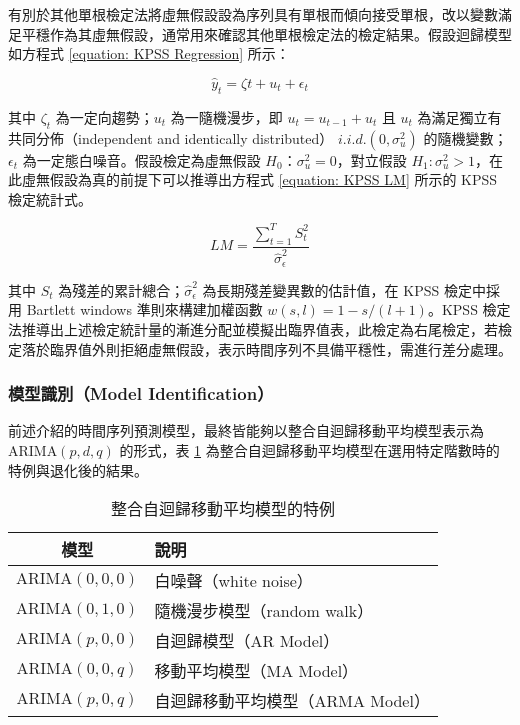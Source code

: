 有別於其他單根檢定法將虛無假設設為序列具有單根而傾向接受單根，改以變數滿足平穩作為其虛無假設，通常用來確認其他單根檢定法的檢定結果。假設迴歸模型如方程式 \eqref{equation: KPSS Regression} 所示：

\begin{equation}\label{equation: KPSS Regression}
  \hat{y}_{t} = \zeta t + u_{t}  + \epsilon_{t}
\end{equation}

其中 $\zeta_t$ 為一定向趨勢；$u_{t}$ 為一隨機漫步，即 $u_{t} = u_{t-1} + u_{t}$ 且 $u_t$ 為滿足獨立有共同分佈（independent and identically distributed） $i.i.d. (0, \sigma_{u}^{2})$ 的隨機變數；$\epsilon_{t}$ 為一定態白噪音。假設檢定為虛無假設 $H_0$：$\sigma_{u}^{2} = 0$，對立假設 $H_1: \sigma_{u}^{2} > 1$，在此虛無假設為真的前提下可以推導出方程式 \eqref{equation: KPSS LM} 所示的 KPSS 檢定統計式。

\begin{equation}\label{equation: KPSS LM}
  LM = \frac{\sum_{t = 1}^{T} S_{t}^{2}}{\hat{\sigma}_{\epsilon}^{2}}
\end{equation}

其中 $S_t$ 為殘差的累計總合；$\hat{\sigma}_{\epsilon}^{2}$ 為長期殘差變異數的估計值，在 KPSS 檢定中採用 Bartlett windows 準則來構建加權函數 $w(s, l) = 1 - s/(l + 1)$。KPSS 檢定法推導出上述檢定統計量的漸進分配並模擬出臨界值表，此檢定為右尾檢定，若檢定落於臨界值外則拒絕虛無假設，表示時間序列不具備平穩性，需進行差分處理。

\subsubsection{模型識別（Model Identification）}

前述介紹的時間序列預測模型，最終皆能夠以整合自迴歸移動平均模型表示為 $\text{ARIMA}(p, d, q)$ 的形式，表 \ref{table: Special Case of ARIMA(p, q, r)} 為整合自迴歸移動平均模型在選用特定階數時的特例與退化後的結果。

\begin{table}[htp]
  \centering
  \caption[整合自迴歸移動平均模型的特例]{整合自迴歸移動平均模型的特例}
  \begin{tabular*}{\textwidth}{cl}
    \toprule
    \textbf{模型}           & \textbf{說明}                     \\
    \midrule
    $\text{ARIMA}(0, 0, 0)$ & 白噪聲（white noise）             \\
    $\text{ARIMA}(0, 1, 0)$ & 隨機漫步模型（random walk）       \\
    $\text{ARIMA}(p, 0, 0)$ & 自迴歸模型（AR Model）            \\
    $\text{ARIMA}(0, 0, q)$ & 移動平均模型（MA Model）          \\
    $\text{ARIMA}(p, 0, q)$ & 自迴歸移動平均模型（ARMA Model）  \\
    \bottomrule
  \end{tabular*}
  \label{table: Special Case of ARIMA(p, q, r)}
\end{table}

